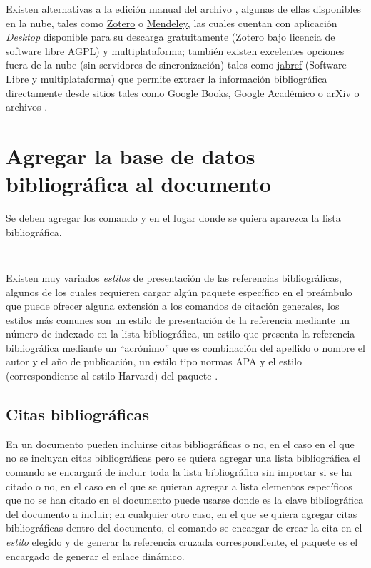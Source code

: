 \documentclass[10pt,a4paper]{article}
\begin{document}
Existen alternativas a la edición manual del archivo , algunas de ellas disponibles en la nube, tales como \href{https://www.zotero.org/}{Zotero} o \href{https://www.mendeley.com/}{Mendeley}, las cuales cuentan con aplicación \emph{Desktop} disponible para su descarga gratuitamente (Zotero bajo licencia de software libre AGPL) y multiplataforma; también existen excelentes opciones fuera de la nube (sin servidores de sincronización) tales como \href{http://www.jabref.org/}{jabref} (Software Libre y multiplataforma) que permite extraer la información bibliográfica directamente desde sitios tales como \href{https://books.google.com/}{Google Books}, \href{https://scholar.google.com/}{Google Académico} o \href{https://arxiv.org/}{arXiv} o archivos .

\section{Agregar la base de datos bibliográfica al documento}

Se deben agregar los comando  y  en el lugar donde se quiera aparezca la lista bibliográfica. 

\begin{verbatim}


\end{verbatim}

Existen muy variados \emph{estilos} de presentación de las referencias bibliográficas, algunos de los cuales requieren cargar algún paquete específico en el preámbulo que puede ofrecer alguna extensión a los comandos de citación generales, los estilos más comunes son  un estilo de presentación de la referencia mediante un número de indexado en la lista bibliográfica,  un estilo que presenta la referencia bibliográfica mediante un ``acrónimo'' que es combinación del apellido o nombre el autor y el año de publicación,  un estilo  tipo normas APA y el estilo  (correspondiente al estilo Harvard) del paquete .

\subsection{Citas bibliográficas}

En un documento pueden incluirse citas bibliográficas o no, en el caso en el que no se incluyan citas bibliográficas pero se quiera agregar una lista bibliográfica el comando  se encargará de incluir toda la lista bibliográfica sin importar si se ha citado o no, en el caso en el que se quieran agregar a lista elementos específicos que no se han citado en el documento puede usarse  donde  es la clave bibliográfica del documento a incluir; en cualquier otro caso, en el que se quiera agregar citas bibliográficas dentro del documento, el comando  se encargar de crear la cita en el \emph{estilo} elegido y de generar la referencia cruzada correspondiente, el paquete  es el encargado de generar el enlace dinámico.
\end{document}
